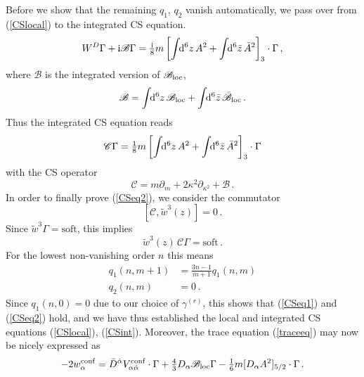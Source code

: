 \documentclass[a4paper,12pt]{article}
\def\C{{\mathscr C}}
\newcommand{\B}{{\mathscr B}}
\newcommand{\Bl}{{\mathscr B}_{\rm loc}}
\newcommand{\Blb}{\bar {\mathscr B}_{\rm loc}}
\newcommand{\I}{{\rm i}}
\def\pr{\partial}
\newcommand{\dS}{\!\!{\rm d}^6z\,}
\newcommand{\dSb}{\!\!{\rm d}^6\bar z\,}
\newcommand{\al}{\alpha}
\newcommand{\da}{{\dot\alpha}}
\newcommand{\tfr}[2]{{\textstyle \frac{#1}{#2}}}
\begin{document}
Before we show that the remaining $q_1$, $q_2$ vanish automatically, we
pass over from (\ref{CSlocal}) to the integrated CS equation.
\begin{equation}
W^D \Gamma +\I \B \Gamma = \tfr{\I}{8} m \left[ \int \dS A^2 + \int \dSb
  \bar A^2 \right]_3 \cdot\Gamma\,,
\end{equation}
where $\B$ is the integrated version of $\Bl$,
\begin{equation}
\B = \int \dS \Bl + \int \dSb  \Blb\,.
\end{equation}
Thus the integrated CS equation reads
\begin{equation}
\C \Gamma =\tfr{1}{8} m \left[ \int \dS A^2 + \int \dSb \bar A^2
\right]_3 \cdot\Gamma \label{CSint}
\end{equation}
with the CS operator
\begin{equation}
\C =  m\pr_m + 2 \kappa^2 \pr_{\kappa^2} +\B \,.
\end{equation}
In order to finally prove (\ref{CSeq2}),
we consider the commutator
\begin{equation}
\left[\C,  \tilde w^3 (z)\right]=0\,.
\end{equation}
Since $\tilde w^3\Gamma=\text{soft}$, this implies
\begin{equation}
 \tilde w^3(z) \, \C \Gamma=\text{soft} \,.
\end{equation}
For the lowest non-vanishing order $n$ this means
\begin{align}
q_1(n,m+1) &= \frac{3n-1}{m+1} q_1(n,m)\\
q_2(n,m) &= 0\,.
\end{align}
Since $q_1(n,0)=0$ due to our choice of $\gamma^{(r)}$,
this shows that (\ref{CSeq1}) and (\ref{CSeq2}) hold, and we have thus
established the local and integrated CS equations (\ref{CSlocal}),
(\ref{CSint}). Moreover, the
trace equation (\ref{traceeq}) may now be nicely expressed as
\begin{equation}
-2 w_\al^{\rm conf} = \bar D^\da V^{\rm conf}_{\al\da} \cdot\Gamma+ \tfr{4}{3} D_\al \Bl \Gamma
 -\tfr{1}{6} m [D_\al A^2]_{5/2}\cdot\Gamma\,.
\label{traceequation2}
\end{equation}
\end{document}
